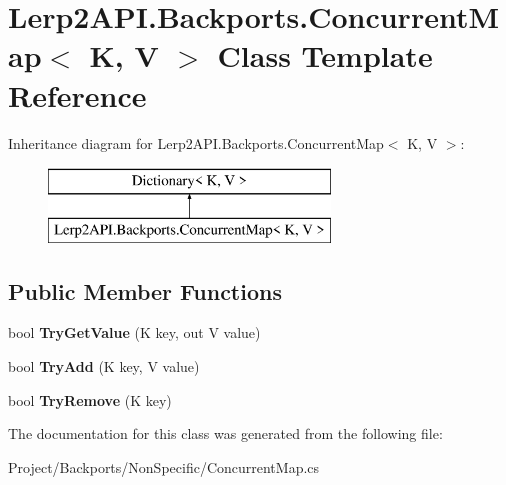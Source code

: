 \hypertarget{class_lerp2_a_p_i_1_1_backports_1_1_concurrent_map}{}\section{Lerp2\+A\+P\+I.\+Backports.\+Concurrent\+Map$<$ K, V $>$ Class Template Reference}
\label{class_lerp2_a_p_i_1_1_backports_1_1_concurrent_map}
Inheritance diagram for Lerp2\+A\+P\+I.\+Backports.\+Concurrent\+Map$<$ K, V $>$\+:\begin{figure}[H]
\begin{center}
\leavevmode
\includegraphics[height=2.000000cm]{class_lerp2_a_p_i_1_1_backports_1_1_concurrent_map}
\end{center}
\end{figure}
\subsection*{Public Member Functions}
\begin{DoxyCompactItemize}
\item 
\mbox{\label{class_lerp2_a_p_i_1_1_backports_1_1_concurrent_map_a5b3540b760d55b81c0c3e02c8ef37d01}} 
bool {\bfseries Try\+Get\+Value} (K key, out V value)
\item 
\mbox{\label{class_lerp2_a_p_i_1_1_backports_1_1_concurrent_map_acb1a50850337dda2d42e3e53df79b2cc}} 
bool {\bfseries Try\+Add} (K key, V value)
\item 
\mbox{\label{class_lerp2_a_p_i_1_1_backports_1_1_concurrent_map_a00e01e943e8152c0c9ee1442c3aa2932}} 
bool {\bfseries Try\+Remove} (K key)
\end{DoxyCompactItemize}


The documentation for this class was generated from the following file\+:\begin{DoxyCompactItemize}
\item 
Project/\+Backports/\+Non\+Specific/Concurrent\+Map.\+cs\end{DoxyCompactItemize}
